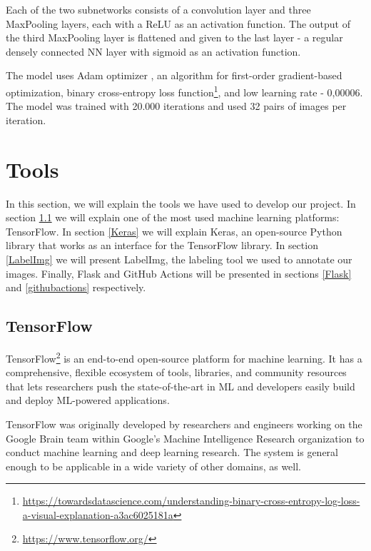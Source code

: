 Each of the two subnetworks consists of a convolution layer and three MaxPooling layers, each with a ReLU as an activation function. The output of the third MaxPooling layer is flattened and given to the last layer - a regular densely connected NN layer with sigmoid as an activation function.

The model uses Adam optimizer \citep{adam}, an algorithm for first-order gradient-based optimization, binary cross-entropy loss function\footnote{\href{https://towardsdatascience.com/understanding-binary-cross-entropy-log-loss-a-visual-explanation-a3ac6025181a}{https://towardsdatascience.com/understanding-binary-cross-entropy-log-loss-a-visual-explanation-a3ac6025181a}}, and low learning rate - 0,00006. The model was trained with 20.000 iterations and used 32 pairs of images per iteration.

\section{Tools}
\label{Tools}

In this section, we will explain the tools we have used to develop our project. In section \ref{TensorFlow} we will explain one of the most used machine learning platforms: TensorFlow. In section \ref{Keras} we will explain Keras, an open-source Python library that works as an interface for the TensorFlow library. In section \ref{LabelImg} we will present LabelImg, the labeling tool we used to annotate our images. Finally, Flask and GitHub Actions will be presented in sections \ref{Flask} and \ref{githubactions} respectively.

\subsection{TensorFlow}
\label{TensorFlow}

TensorFlow\footnote{\href{https://www.tensorflow.org/}{https://www.tensorflow.org/}} is an end-to-end open-source platform for machine learning. It has a comprehensive, flexible ecosystem of tools, libraries, and community resources that lets researchers push the state-of-the-art in ML and developers easily build and deploy ML-powered applications. 

TensorFlow was originally developed by researchers and engineers working on the Google Brain team within Google's Machine Intelligence Research organization to conduct machine learning and deep learning research. The system is general enough to be applicable in a wide variety of other domains, as well.

